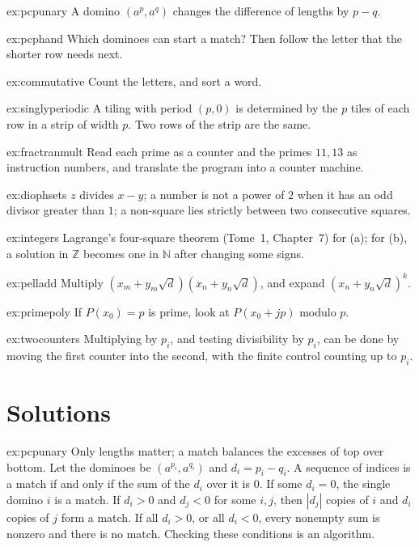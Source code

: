 \begin{hint}{ex:pcpunary}
A domino $(a^p,a^q)$ changes the difference of lengths by $p-q$.
\end{hint}
\begin{hint}{ex:pcphand}
Which dominoes can start a match? Then follow the letter that the shorter row needs next.
\end{hint}
\begin{hint}{ex:commutative}
Count the letters, and sort a word.
\end{hint}
\begin{hint}{ex:singlyperiodic}
A tiling with period $(p,0)$ is determined by the $p$ tiles of each row in a strip of width $p$. Two rows of the strip are the same.
\end{hint}
\begin{hint}{ex:fractranmult}
Read each prime as a counter and the primes $11,13$ as instruction numbers, and translate the program into a counter machine.
\end{hint}
\begin{hint}{ex:diophsets}
$z$ divides $x-y$; a number is not a power of $2$ when it has an odd divisor greater than $1$; a non-square lies strictly between two consecutive squares.
\end{hint}
\begin{hint}{ex:integers}
Lagrange's four-square theorem (Tome~1, Chapter~7) for (a); for (b), a solution in $\mathbb Z$ becomes one in $\mathbb N$ after changing some signs.
\end{hint}
\begin{hint}{ex:pelladd}
Multiply $(x_m+y_m\sqrt d)(x_n+y_n\sqrt d)$, and expand $(x_n+y_n\sqrt d)^k$.
\end{hint}
\begin{hint}{ex:primepoly}
If $P(x_0)=p$ is prime, look at $P(x_0+jp)$ modulo $p$.
\end{hint}
\begin{hint}{ex:twocounters}
Multiplying by $p_i$, and testing divisibility by $p_i$, can be done by moving the first counter into the second, with the finite control counting up to $p_i$.
\end{hint}

\section{Solutions}

\begin{solution}{ex:pcpunary}
\idea Only lengths matter; a match balances the excesses of top over bottom.
\writeup Let the dominoes be $(a^{p_i},a^{q_i})$ and $d_i=p_i-q_i$. A sequence of indices is a match if and only if the sum of the $d_i$ over it is $0$. If some $d_i=0$, the single domino $i$ is a match. If $d_i>0$ and $d_j<0$ for some $i,j$, then $|d_j|$ copies of $i$ and $d_i$ copies of $j$ form a match. If all $d_i>0$, or all $d_i<0$, every nonempty sum is nonzero and there is no match. Checking these conditions is an algorithm.
\end{solution}

